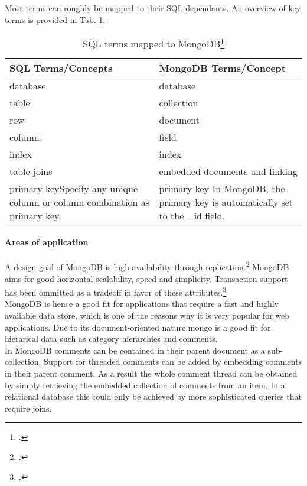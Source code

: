 Most terms can roughly be mapped to their SQL dependants. An overview of key terms
is provided in Tab. \ref{tab:sql-mongo-map}.

\begin{table}[ht]
\begin{tabular*}{0.95\textwidth}{p{} p{}}
\toprule
\textbf{SQL Terms/Concepts} & \textbf{MongoDB Terms/Concept}\\
\midrule 
database & 	database\\
table 	 &	collection\\
row 	 &	document\\
column 	 &	field\\
index 	 &	index\\
table joins &	embedded documents and linking\\
primary key\newline Specify any unique column or column combination as primary
key.
		&
primary key\newline
In MongoDB, the primary key is automatically set to the \_id field.\\

\bottomrule 
\end{tabular*}
  \begin{savenotes}
  \caption[SQL terms mapped to MongoDB]{SQL terms mapped to
  MongoDB\footcite[][]{mongo_sql_comp} }
  \label{tab:sql-mongo-map}
  \end{savenotes}
\end{table}


\paragraph{Areas of application}
A design goal of MongoDB is high availability through
replication.\footcite[Cf.][3]{Plugge_2010}
MongoDB aims for good horizontal scalability, speed and simplicity. Transaction
support has been ommitted as a tradeoff in favor of these
attributes.\footcite[Cf.][5]{Plugge_2010}\\
MongoDB is hence a good fit for applications that require a fast and highly
available data store, which is one of the reasons why it is very popular for web
applications. Due to its document-oriented nature mongo is a good fit for
hierarical data such as category hierarchies and comments.\\
In MongoDB comments can be contained in their parent document as a
sub-collection. Support for threaded comments can be added by embedding comments
in their parent comment. As a result the whole comment thread can be obtained
 by simply retrieving the embedded collection of comments from an item.
In a relational database this could only be achieved by more sophisticated
queries that require joins.

